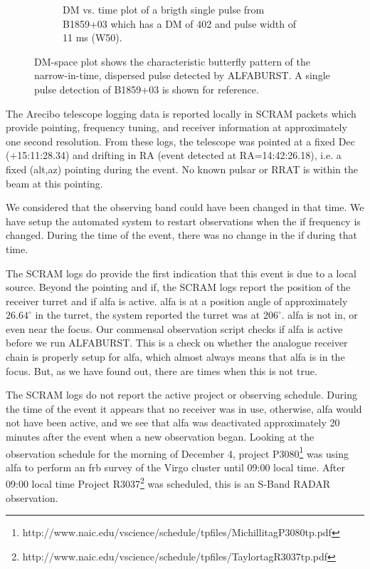 \documentclass[a4paper,fleqn,usenatbib]{mnras}
\begin{document}
\begin{figure}
\begin{subfigure}[t]{0.5\textwidth}
        \caption{DM vs. time plot of a brigth single pulse from B1859+03 which
        has a DM of 402 and pulse width of 11 ms (W50).
        }
        \label{fig:dm_time_B1859}
    \end{subfigure}
    \caption{DM-space plot shows the characteristic butterfly pattern of the
    narrow-in-time, dispersed pulse detected by ALFABURST. A single pulse
    detection of B1859+03 is shown for reference.
    }
    \label{fig:dm_time}
\end{figure}

The Arecibo telescope logging data is reported locally in SCRAM packets which
provide pointing, frequency tuning, and receiver information at approximately
one second resolution. From these logs, the telescope was pointed at a fixed Dec
(+15:11:28.34) and drifting in RA (event detected at RA=14:42:26.18), i.e. a
fixed (alt,az) pointing during the event. No known pulsar or RRAT is within the
beam at this pointing.

We considered that the observing band could have been changed in that time.  We
have setup the automated system to restart observations when the \gls{if}
frequency is changed.  During the time of the event, there was no change in the
\gls{if} during that time.

The SCRAM logs do provide the first indication that this event is due to a local
source. Beyond the pointing and \gls{if}, the SCRAM logs report the position of
the receiver turret and if \gls{alfa} is active. \gls{alfa} is at a position
angle of approximately $26.64^{\circ}$ in the turret, the system reported the
turret was at $206^{\circ}$. \gls{alfa} is not in, or even near the focus.  Our
commensal observation script checks if \gls{alfa} is active before we run
ALFABURST. This is a check on whether the analogue receiver chain is properly
setup for \gls{alfa}, which almost always means that \gls{alfa} is in the focus.
But, as we have found out, there are times when this is not true.

The SCRAM logs do not report the active project or observing schedule. During
the time of the event it appears that no receiver was in use, otherwise,
\gls{alfa} would not have been active, and we see that \gls{alfa} was
deactivated approximately 20 minutes after the event when a new observation
began.  Looking at the observation schedule for the morning of December 4,
project
P3080\footnote{http://www.naic.edu/vscience/schedule/tpfiles/MichillitagP3080tp.pdf}
was using \gls{alfa} to perform an \gls{frb} survey of the Virgo cluster until
09:00 local time.  After 09:00 local time Project
R3037\footnote{http://www.naic.edu/vscience/schedule/tpfiles/TaylortagR3037tp.pdf}
was scheduled, this is an S-Band RADAR observation. 
\end{document}
